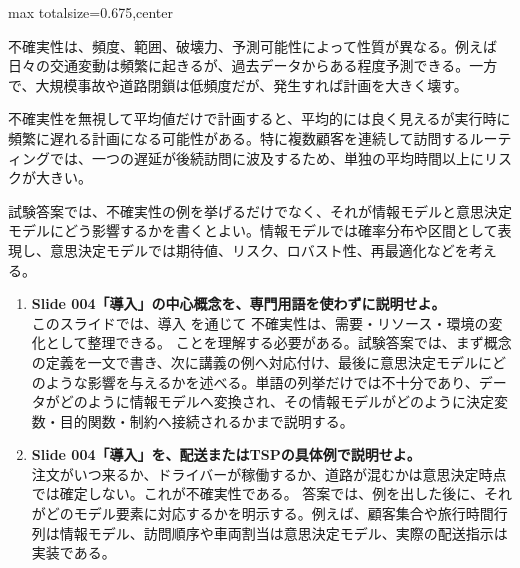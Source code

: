 \begin{adjustbox}{max totalsize={\textwidth}{0.675\textheight},center}
\begin{minipage}{\textwidth}
\begin{minipage}[t]{0.485\textwidth}
不確実性は、頻度、範囲、破壊力、予測可能性によって性質が異なる。例えば日々の交通変動は頻繁に起きるが、過去データからある程度予測できる。一方で、大規模事故や道路閉鎖は低頻度だが、発生すれば計画を大きく壊す。\par
不確実性を無視して平均値だけで計画すると、平均的には良く見えるが実行時に頻繁に遅れる計画になる可能性がある。特に複数顧客を連続して訪問するルーティングでは、一つの遅延が後続訪問に波及するため、単独の平均時間以上にリスクが大きい。\par
試験答案では、不確実性の例を挙げるだけでなく、それが情報モデルと意思決定モデルにどう影響するかを書くとよい。情報モデルでは確率分布や区間として表現し、意思決定モデルでは期待値、リスク、ロバスト性、再最適化などを考える。\par
{}
\begin{enumerate}
\item \textbf{Slide 004「導入」の中心概念を、専門用語を使わずに説明せよ。}\\このスライドでは、導入 を通じて 不確実性は、需要・リソース・環境の変化として整理できる。 ことを理解する必要がある。試験答案では、まず概念の定義を一文で書き、次に講義の例へ対応付け、最後に意思決定モデルにどのような影響を与えるかを述べる。単語の列挙だけでは不十分であり、データがどのように情報モデルへ変換され、その情報モデルがどのように決定変数・目的関数・制約へ接続されるかまで説明する。
\item \textbf{Slide 004「導入」を、配送またはTSPの具体例で説明せよ。}\\注文がいつ来るか、ドライバーが稼働するか、道路が混むかは意思決定時点では確定しない。これが不確実性である。 答案では、例を出した後に、それがどのモデル要素に対応するかを明示する。例えば、顧客集合や旅行時間行列は情報モデル、訪問順序や車両割当は意思決定モデル、実際の配送指示は実装である。
\end{enumerate}
\end{minipage}
\end{minipage}
\end{adjustbox}

